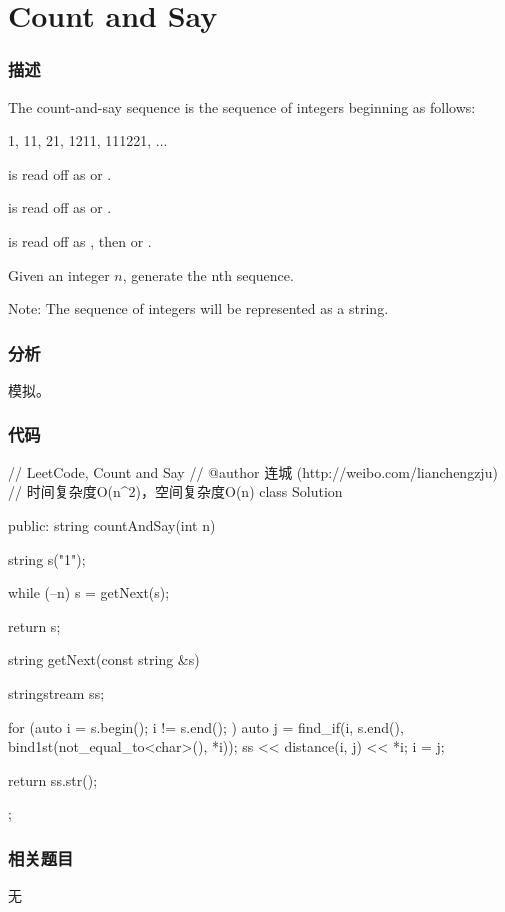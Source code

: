 \section{Count and Say} %
\label{sec:count-and-say}


\subsubsection{描述}
The count-and-say sequence is the sequence of integers beginning as follows:
\begin{Code}
1, 11, 21, 1211, 111221, ...
\end{Code}

 is read off as  or .

 is read off as  or .

 is read off as , then  or .

Given an integer $n$, generate the nth sequence.

Note: The sequence of integers will be represented as a string.


\subsubsection{分析}
模拟。


\subsubsection{代码}
\begin{Code}
// LeetCode, Count and Say
// @author 连城 (http://weibo.com/lianchengzju)
// 时间复杂度O(n^2)，空间复杂度O(n)
class Solution {
public:
    string countAndSay(int n) {
        string s("1");

        while (--n)
            s = getNext(s);

        return s;
    }

    string getNext(const string &s) {
        stringstream ss;

        for (auto i = s.begin(); i != s.end(); ) {
            auto j = find_if(i, s.end(), bind1st(not_equal_to<char>(), *i));
            ss << distance(i, j) << *i;
            i = j;
        }

        return ss.str();
    }
};
\end{Code}


\subsubsection{相关题目}
\begindot
\item 无
\myenddot


